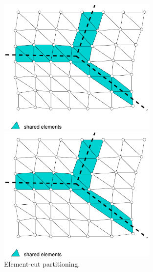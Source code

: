 \documentclass[a4paper]{article}
\begin{document}
\begin{figure}[htb]
\begin{htmlonly}
  \centerline{\includegraphics[width=0.7\textwidth]{elementcut0}}
\end{htmlonly}
\centerline{\includegraphics[width=0.7\textwidth]{elementcut0}}
\caption{Element-cut partitioning.}
\label{elmentcut}
\end{figure}
\end{document}
